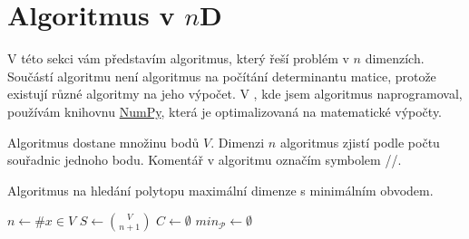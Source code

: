 \section{Algoritmus v \texorpdfstring{$n$D}{nD}}
V této sekci vám představím algoritmus, který řeší problém v $n$ dimenzích. Součástí algoritmu není algoritmus na počítání determinantu matice, protože existují různé algoritmy na jeho výpočet. V , kde jsem algoritmus naprogramoval, používám knihovnu \href{https://numpy.org/doc/stable/index.html}{NumPy}, která je optimalizovaná na matematické výpočty. 

Algoritmus dostane množinu bodů $V$. Dimenzi $n$ algoritmus zjistí podle počtu souřadnic jednoho bodu. Komentář v algoritmu označím symbolem //.

\begin{algorithm}[H]
    \caption{Algoritmus na hledání polytopu maximální dimenze s minimálním obvodem.}
    \label{alg:algoritmus_nd}


    \BlankLine
    \BlankLine

    $n \leftarrow \#x \in V$ \;
    $S \leftarrow \binom{V}{n+1}$\;
    $C \leftarrow \emptyset$\; 
    $min_\mathcal{P} \leftarrow \emptyset$\;
    \KwReturn{$\emptyset$}\;
   \end{algorithm}